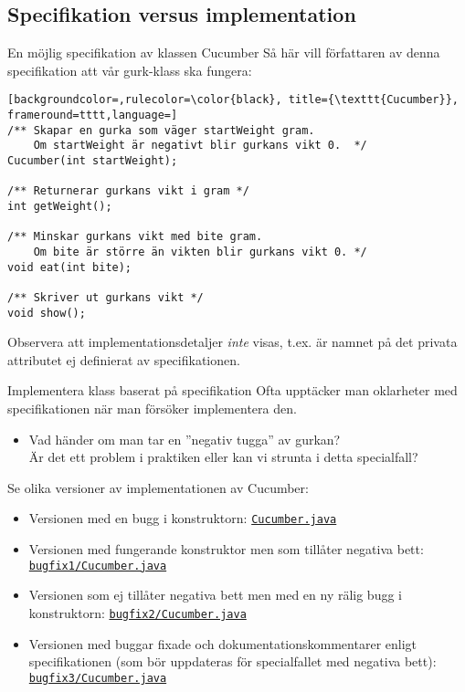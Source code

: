 \documentclass{lecturenotes}
\begin{document}
\subsection{Specifikation versus implementation}
\begin{Slide}{En möjlig specifikation av klassen Cucumber}
\footnotesize Så här vill författaren av denna specifikation att vår gurk-klass ska fungera:
\begin{lstlisting}[backgroundcolor=,rulecolor=\color{black}, title={\texttt{Cucumber}}, frameround=tttt,language=]
/** Skapar en gurka som väger startWeight gram. 
    Om startWeight är negativt blir gurkans vikt 0.  */
Cucumber(int startWeight);

/** Returnerar gurkans vikt i gram */
int getWeight();

/** Minskar gurkans vikt med bite gram. 
    Om bite är större än vikten blir gurkans vikt 0. */
void eat(int bite);

/** Skriver ut gurkans vikt */
void show();
\end{lstlisting}
Observera att implementationsdetaljer \textit{inte} visas, t.ex. är namnet på det privata attributet ej definierat av specifikationen.
\end{Slide}

\begin{Slide}{Implementera klass baserat på specifikation} \footnotesize
Ofta upptäcker man oklarheter med specifikationen när man försöker implementera den.
\begin{itemize}
\item Vad händer om man tar en ''negativ tugga'' av gurkan? \\
Är det ett problem i praktiken eller kan vi strunta i detta specialfall?
\end{itemize}
Se olika versioner av implementationen av Cucumber:
\begin{itemize}
\item Versionen med en bugg i konstruktorn: \href{https://github.com/bjornregnell/lth-eda016-2015/blob/master/lectures/examples/terminal/constructor/Cucumber.java}{\texttt{Cucumber.java}}
\item Versionen med fungerande konstruktor men som tillåter negativa bett: \href{https://github.com/bjornregnell/lth-eda016-2015/blob/master/lectures/examples/terminal/constructor/bugfix1/Cucumber.java}{\texttt{bugfix1/Cucumber.java}}
\item Versionen som ej tillåter negativa bett men med en ny rälig bugg i konstruktorn: \href{https://github.com/bjornregnell/lth-eda016-2015/blob/master/lectures/examples/terminal/constructor/bugfix2/Cucumber.java}{\texttt{bugfix2/Cucumber.java}}
\item Versionen med buggar fixade och dokumentationskommentarer enligt specifikationen (som bör uppdateras för specialfallet med negativa bett): \href{https://github.com/bjornregnell/lth-eda016-2015/blob/master/lectures/examples/terminal/constructor/bugfix3/Cucumber.java}{\texttt{bugfix3/Cucumber.java}}
\end{itemize}
\end{Slide}
\end{document}
